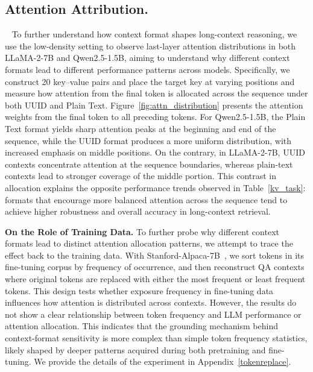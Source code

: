 \documentclass{article} %
\newcommand{\llama}{LLaMA-2-7B}
\newcommand{\qwen}{Qwen2.5-1.5B}
\begin{document}
\subsection{Attention Attribution.}~\label{attention}
To further understand how context format shapes long-context reasoning, we use the low-density setting to observe last-layer attention distributions in both \llama{} and \qwen{}, aiming to understand why different context formats lead to different performance patterns across models. Specifically, we construct 20 key–value pairs and place the target key at varying positions and measure how attention from the final token is allocated across the sequence under both UUID and Plain Text.
Figure~\ref{fig:attn_distribution} presents the attention weights from the final token to all preceding tokens. For \qwen{}, the Plain Text format yields sharp attention peaks at the beginning and end of the sequence, while the UUID format produces a more uniform distribution, with increased emphasis on middle positions. On the contrary, in \llama{}, UUID contexts concentrate attention at the sequence boundaries, whereas plain-text contexts lead to stronger coverage of the middle portion. This contrast in allocation explains the opposite performance trends observed in Table~\ref{kv_task}: formats that encourage more balanced attention across the sequence tend to achieve higher robustness and overall accuracy in long-context retrieval.

\textbf{On the Role of Training Data.}
To further probe why different context formats lead to distinct attention allocation patterns, we attempt to trace the effect back to the training data. With Stanford-Alpaca-7B~\citep{alpaca}, we sort tokens in its fine-tuning corpus by frequency of occurrence, and then reconstruct QA contexts where original tokens are replaced with either the most frequent or least frequent tokens. This design tests whether exposure frequency in fine-tuning data influences how attention is distributed across contexts. However, the results do not show a clear relationship between token frequency and LLM performance or attention allocation. This indicates that the grounding mechanism behind context-format sensitivity is more complex than simple token frequency statistics, likely shaped by deeper patterns acquired during both pretraining and fine-tuning. We provide the details of the experiment in Appendix~\ref{tokenreplace}.
\end{document}
